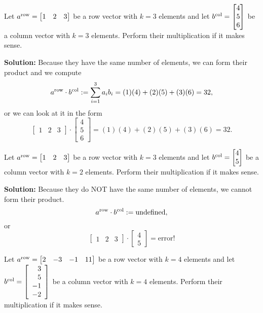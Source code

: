 \begin{example}
\label{ex:RowTImesColumn01} 
Let $a^{\rm row}=\begin{bmatrix} 1 & 2 & 3 \end{bmatrix}$ be a row vector with $k=3$ elements and let $b^{\rm col}= \begin{bmatrix}4 \\5 \\ 6 \end{bmatrix}$ be a column vector with $k=3$ elements. Perform their multiplication if it makes sense.
\end{example}

\textbf{Solution:}
Because they have the same number of elements, we can form their product and we compute 
$$a^{\rm row} \cdot b^{\rm col}:= \sum_{i=1}^3 a_i b_i = (1)(4) + (2)(5) + (3)(6) = 32, $$
or we can look at it in the form
$$\begin{bmatrix} 1 & 2 & 3 \end{bmatrix} \cdot   \begin{bmatrix}4 \\5 \\ 6 \end{bmatrix} = (1)(4) + (2)(5) + (3)(6) = 32.$$
\Qed

\begin{example}
\label{ex:RowTImesColumn02} 
Let $a^{\rm row}=\begin{bmatrix} 1 & 2 & 3 \end{bmatrix}$ be a row vector with $k=3$ elements and let $b^{\rm col}= \begin{bmatrix}4 \\5  \end{bmatrix}$ be a column vector with $k=2$ elements. Perform their multiplication if it makes sense.
\end{example}

\textbf{Solution:}
Because they do NOT have the same number of elements, we cannot form their product. 
$$a^{\rm row} \cdot b^{\rm col}:= \text{undefined},$$
or 
$$\begin{bmatrix} 1 & 2 & 3 \end{bmatrix} \cdot  \begin{bmatrix}4 \\5  \end{bmatrix} = \text{error!}$$
\Qed  

\begin{example}
\label{ex:RowTImesColumn03} 
Let $a^{\rm row}=\begin{bmatrix} 2 & -3 & -1 & 11\end{bmatrix}$ be a row vector with $k=4$ elements and let $b^{\rm col}= \left[\begin{array}{r}3 \\5 \\ -1 \\ -2 \end{array} \right]$ be a column vector with $k=4$ elements. Perform their multiplication if it makes sense.
\end{example}

